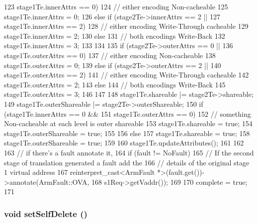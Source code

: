 \begin{DoxyCode}
{{{123                 stage1Te.innerAttrs  == 0) {
124                 // either encoding Non-cacheable
125                 stage1Te.innerAttrs = 0;
126             } else if (stage2Te->innerAttrs == 2 ||
127                        stage1Te.innerAttrs  == 2) {
128                 // either encoding Write-Through cacheable
129                 stage1Te.innerAttrs = 2;
130             } else {
131                 // both encodings Write-Back
132                 stage1Te.innerAttrs = 3;
133             }
134 
135             if (stage2Te->outerAttrs == 0 ||
136                 stage1Te.outerAttrs  == 0) {
137                 // either encoding Non-cacheable
138                 stage1Te.outerAttrs = 0;
139             } else if (stage2Te->outerAttrs == 2 ||
140                        stage1Te.outerAttrs  == 2) {
141                 // either encoding Write-Through cacheable
142                 stage1Te.outerAttrs = 2;
143             } else {
144                 // both encodings Write-Back
145                 stage1Te.outerAttrs = 3;
146             }
147 
148             stage1Te.shareable       |= stage2Te->shareable;
149             stage1Te.outerShareable |= stage2Te->outerShareable;
150             if (stage1Te.innerAttrs == 0 &&
151                 stage1Te.outerAttrs == 0) {
152                 // something Non-cacheable at each level is outer shareable
153                 stage1Te.shareable       = true;
154                 stage1Te.outerShareable = true;
155             }
156         } else {
157             stage1Te.shareable       = true;
158             stage1Te.outerShareable = true;
159         }
160         stage1Te.updateAttributes();
161     }
162 
163     // if there's a fault annotate it,
164     if (fault != NoFault) {
165         // If the second stage of translation generated a fault add the
166         // details of the original stage 1 virtual address
167         reinterpret_cast<ArmFault *>(fault.get())->annotate(ArmFault::OVA,
168             s1Req->getVaddr());
169     }
170     complete = true;
171 }
\end{DoxyCode}
\hypertarget{classArmISA_1_1Stage2LookUp_afc49b5786125a229938153fa655c23f1}{
\subsubsection[{setSelfDelete}]{\setlength{\rightskip}{0pt plus 5cm}void setSelfDelete ()}}
\label{classArmISA_1_1Stage2LookUp_afc49b5786125a229938153fa655c23f1}



